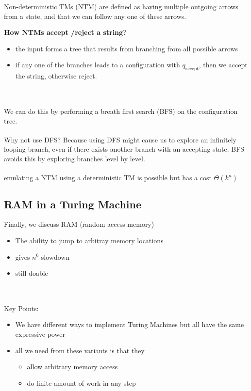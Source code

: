 \documentclass[12pt]{article}
\begin{document}
Non-deterministic TMs (NTM) are defined as having multiple outgoing arrows from a state, and that we can follow any one of these arrows.

\textbf{How NTMs accept \slash reject a string}?
\begin{itemize}
    \item the input forms a tree that results from branching from all possible arrows
    \item if any one of the branches leads to a configuration with $q_\text{accept}$, then we accept the string, otherwise reject.
\end{itemize}
\\
\\
We can do this by performing a breath first search (BFS) on the configuration tree.
\\
\\
Why not use DFS? Because using DFS might cause us to explore an infinitely looping branch, even if there exists another branch with an accepting state. BFS avoids this by exploring branches level by level.
\\
\\
emulating a NTM using a deterministic TM is possible but has a cost $\Theta (k^n)$

\subsection{RAM in a Turing Machine}

Finally, we discuss RAM (random access memory)
\begin{itemize}
    \item The ability to jump to arbitray memory locations
    \item gives $n^6$ slowdown
    \item still doable
\end{itemize}
\\
\\
Key Points:
\begin{itemize}
    \item We have different ways to implement Turing Machines but all have the same expressive power
    \item all we need from these variants is that they
    \begin{itemize}
        \item allow arbitrary memory access
        \item do finite amount of work in any step
    \end{itemize}
\end{itemize}
\end{document}
